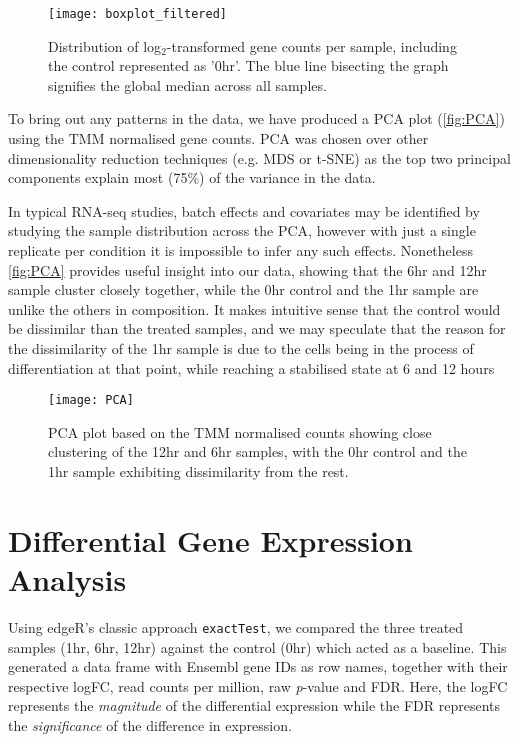 \begin{figure}[!h]
    \centering
    \texttt{[image: boxplot\_filtered]}
    \caption{Distribution of log$_2$-transformed gene counts per sample, including the control represented as '0hr'. The blue line bisecting the graph signifies the global median across all samples.} 
    \label{fig:boxplot_filtered}
\end{figure}
\clearpage

To bring out any patterns in the data, we have produced a PCA plot (\autoref{fig:PCA}) using the \ac{TMM} normalised gene counts. PCA was chosen over other dimensionality reduction techniques (e.g. MDS or t-SNE) as the top two principal components explain most (75\%) of the variance in the data. 

In typical RNA-seq studies, batch effects and covariates may be identified by studying the sample distribution across the PCA, however with just a single replicate per condition it is impossible to infer any such effects. Nonetheless \autoref{fig:PCA} provides useful insight into our data, showing that the 6hr and 12hr sample cluster closely together, while the 0hr control and the 1hr sample are unlike the others in composition. It makes intuitive sense that the control would be dissimilar than the treated samples, and we may speculate that the reason for the dissimilarity of the 1hr sample is due to the cells being in the process of differentiation at that point, while reaching a stabilised state at 6 and 12 hours


\begin{figure}[!h]
    \centering
    \texttt{[image: PCA]}
    \caption{PCA plot based on the TMM normalised counts showing close clustering of the 12hr and 6hr samples, with the 0hr control and the 1hr sample exhibiting dissimilarity from the rest.}
    \label{fig:PCA}
\end{figure}



\section{Differential Gene Expression Analysis}
Using edgeR's classic approach \texttt{exactTest}, we compared the three treated samples (1hr, 6hr, 12hr) against the control (0hr) which acted as a baseline. This generated a data frame with Ensembl gene IDs as row names, together with their respective \ac{logFC}, read counts per million, raw \textit{p}-value and \ac{FDR}. Here, the \ac{logFC} represents the \textit{magnitude} of the differential expression while the \ac{FDR} represents the \textit{significance} of the difference in expression. 

